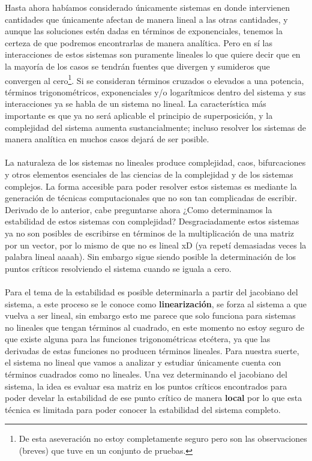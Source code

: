 \documentclass[11pt,a4paper]{article}
\begin{document}
Hasta ahora habíamos considerado únicamente sistemas en donde intervienen cantidades que únicamente afectan de manera lineal a las otras cantidades, y aunque las soluciones estén dadas en términos de exponenciales, tenemos la certeza de que podremos encontrarlas de manera analítica. Pero en sí las interacciones de estos sistemas son puramente lineales lo que quiere decir que en la mayoría de los casos se tendrán fuentes que divergen y sumideros que convergen al cero\footnote{De esta aseveración no estoy completamente seguro pero son las observaciones (breves) que tuve en un conjunto de pruebas.}. Si se consideran términos cruzados o elevados a una potencia, términos trigonométricos, exponenciales y/o logarítmicos dentro del sistema y sus interacciones ya se habla de un sistema no lineal. La característica más importante es que ya no será aplicable el principio de superposición, y la complejidad del sistema aumenta sustancialmente; incluso resolver los sistemas de manera analítica en muchos casos dejará de ser posible.\\
\\
La naturaleza de los sistemas no lineales produce complejidad, caos, bifurcaciones y otros elementos esenciales de las ciencias de la complejidad y de los sistemas complejos. La forma accesible para poder resolver estos sistemas es mediante la generación de técnicas computacionales que no son tan complicadas de escribir. Derivado de lo anterior, cabe preguntarse ahora ¿Como determinamos la estabilidad de estos sistemas con complejidad? Desgraciadamente estos sistemas ya no son posibles de escribirse en términos de la multiplicación de una matriz por un vector, por lo mismo de que no es lineal xD (ya repetí demasiadas veces la palabra lineal aaaah). Sin embargo sigue siendo posible la determinación de los puntos críticos resolviendo el sistema cuando se iguala a cero.\\
\\
Para el tema de la estabilidad es posible determinarla a partir del jacobiano del sistema, a este proceso se le conoce como \textbf{linearización}, se forza al sistema a que vuelva a ser lineal, sin embargo esto me parece que solo funciona para sistemas no lineales que tengan términos al cuadrado, en este momento no estoy seguro de que existe alguna para las funciones trigonométricas etcétera, ya que las derivadas de estas funciones no producen términos lineales. Para nuestra suerte, el sistema no lineal que vamos a analizar y estudiar únicamente cuenta con términos cuadrados como no lineales. Una vez determinando el jacobiano del sistema, la idea es evaluar esa matriz en los puntos críticos encontrados para poder develar la estabilidad de ese punto crítico de manera \textbf{local} por lo que esta técnica es limitada para poder conocer la estabilidad del sistema completo. \\
\end{document}
